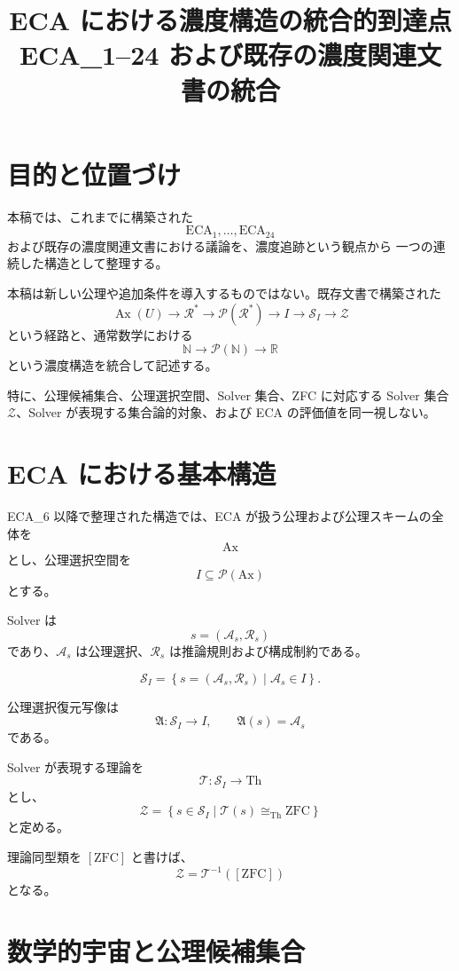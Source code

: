 \documentclass[11pt,a4paper]{article}
\title{ECA における濃度構造の統合的到達点\\
\large ECA\_1--24 および既存の濃度関連文書の統合}
\author{}
\date{}
\newcommand{\Ax}{\mathrm{Ax}}
\newcommand{\Pow}{\mathcal P}
\newcommand{\Solver}{\mathcal S}
\newcommand{\Zset}{\mathcal Z}
\newcommand{\Th}{\mathrm{Th}}
\newcommand{\Rstar}{\mathcal R^*}
\newcommand{\N}{\mathbb N}
\newcommand{\R}{\mathbb R}
\begin{document}
\maketitle
\tableofcontents

\section{目的と位置づけ}

本稿では、これまでに構築された
\[
\mathrm{ECA}_1,\ldots,\mathrm{ECA}_{24}
\]
および既存の濃度関連文書における議論を、濃度追跡という観点から
一つの連続した構造として整理する。

本稿は新しい公理や追加条件を導入するものではない。既存文書で構築された
\[
\operatorname{Ax}(U)\longrightarrow
\Rstar\longrightarrow
\Pow(\Rstar)\longrightarrow
I\longrightarrow
\Solver_I\longrightarrow
\Zset
\]
という経路と、通常数学における
\[
\N\longrightarrow\Pow(\N)\longrightarrow\R
\]
という濃度構造を統合して記述する。

特に、公理候補集合、公理選択空間、Solver 集合、ZFC に対応する
Solver 集合 $\Zset$、Solver が表現する集合論的対象、および
ECA の評価値を同一視しない。

\section{ECA における基本構造}

ECA_6 以降で整理された構造では、ECA が扱う公理および公理スキームの全体を
\[
\Ax
\]
とし、公理選択空間を
\[
I\subseteq\Pow(\Ax)
\]
とする。

Solver は
\[
s=(\mathcal A_s,\mathcal R_s)
\]
であり、$\mathcal A_s$ は公理選択、$\mathcal R_s$ は推論規則および構成制約である。

\[
\Solver_I=
\left\{
s=(\mathcal A_s,\mathcal R_s)\mid
\mathcal A_s\in I
\right\}.
\]

公理選択復元写像は
\[
\mathfrak A:\Solver_I\to I,
\qquad
\mathfrak A(s)=\mathcal A_s
\]
である。

Solver が表現する理論を
\[
\mathcal T:\Solver_I\to\Th
\]
とし、
\[
\boxed{
\Zset=
\left\{
s\in\Solver_I\mid
\mathcal T(s)\cong_{\mathrm{Th}}\mathrm{ZFC}
\right\}
}
\]
と定める。

理論同型類を $[\mathrm{ZFC}]$ と書けば、
\[
\boxed{
\Zset=\mathcal T^{-1}([\mathrm{ZFC}])
}
\]
となる。

\section{数学的宇宙と公理候補集合}
\end{document}
